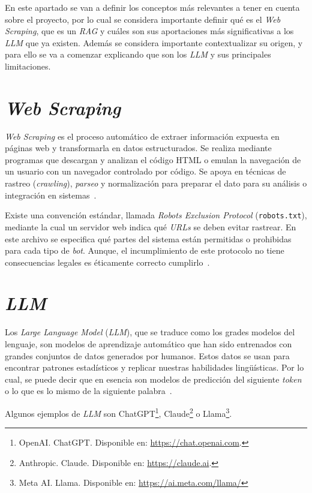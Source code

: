 
En este apartado se van a definir los conceptos más relevantes a tener en cuenta sobre el proyecto, por lo cual se considera importante definir qué es el \textit{Web Scraping}, que es un \textit{RAG} y cuáles son sus aportaciones más significativas a los \textit{LLM} que ya existen. Además se considera importante contextualizar su origen, y para ello se va a comenzar explicando que son los \textit{LLM} y sus principales limitaciones.

\section{\textit{Web Scraping}}
\textit{Web Scraping} es el proceso automático de extraer información expuesta en páginas web y transformarla en datos estructurados. Se realiza mediante programas que descargan y analizan el código HTML o emulan la navegación de un usuario con un navegador controlado por código. Se apoya en técnicas de rastreo (\textit{crawling}), \textit{parseo} y normalización para preparar el dato para su análisis o integración en sistemas~\cite{webScraping}.

Existe una convención estándar, llamada \textit{Robots Exclusion Protocol} (\texttt{robots.txt}), mediante la cual un servidor web indica qué \textit{URLs} se deben evitar rastrear. En este archivo se especifica qué partes del sistema están permitidas o prohibidas para cada tipo de \textit{bot}. Aunque, el incumplimiento de este protocolo no tiene consecuencias legales es éticamente correcto cumplirlo~\cite{rfc9309}. 

\section{\textit{LLM}}
Los \textit{Large Language Model} (\textit{LLM}), que se traduce como los grades modelos del lenguaje, son modelos de aprendizaje automático que han sido entrenados con grandes conjuntos de datos generados por humanos. Estos datos se usan para encontrar patrones estadísticos y replicar nuestras habilidades lingüísticas. Por lo cual, se puede decir que en esencia son modelos de predicción del siguiente \textit{token} o lo que es lo mismo de la siguiente palabra~\cite{book:RAG_SimpleGuide}.

Algunos ejemplos de \textit{LLM} son ChatGPT\footnote{OpenAI. ChatGPT. Disponible en: \url{https://chat.openai.com}.}, Claude\footnote{Anthropic. Claude. Disponible en: \url{https://claude.ai}.} o Llama\footnote{Meta AI. Llama. Disponible en: \url{https://ai.meta.com/llama/}}.

